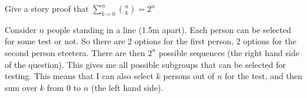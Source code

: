 
\setcounter{theorem}{14}
\begin{exercise}[BH.1.15]
	Give a story proof that $\sum_{k = 0}^n \binom{n}{k} = 2^n$
\begin{solution}
	Consider $n$ people standing in a line (1.5m apart). Each person can be selected for some test or not. So there are 2 options for the first person, 2 options for the second person etcetera. There are then $2^n$ possible sequences (the right hand side of the question). This gives me all possible subgroups that can be selected for testing. This means that I can also select $k$ persons out of $n$ for the test, and then sum over $k$ from $0$ to $n$ (the left hand side).
\end{solution}
\end{exercise}


